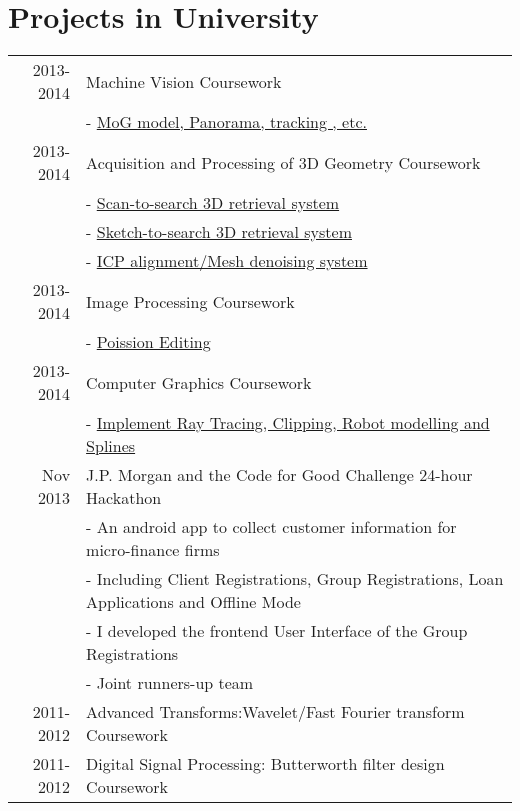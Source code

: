 \documentclass[a4paper,10pt]{article}
\begin{document}
\section{Projects in University}
\begin{tabular}{rp{12cm}}
2013-2014 &Machine Vision
\hfill{\textcolor[rgb]{0.7,0.7,0.7}{Coursework}}\\
         & - \href{https://github.com/mincongzhang/MachineVision}{MoG model, Panorama, tracking , etc.}\\
2013-2014 &Acquisition and Processing of 3D Geometry
\hfill{\textcolor[rgb]{0.7,0.7,0.7}{Coursework}}\\
         & - \href{https://github.com/mincongzhang/3D_Retrieval_scan2search}{Scan-to-search 3D retrieval system}\\
         & - \href{https://github.com/mincongzhang/3D_Retrieval_sketch2search}{Sketch-to-search 3D retrieval system}\\
         & - \href{https://github.com/mincongzhang/PlayWithOpenMesh}{ICP alignment/Mesh denoising system}\\
2013-2014 &Image Processing
\hfill{\textcolor[rgb]{0.7,0.7,0.7}{Coursework}}\\
         & - \href{https://github.com/mincongzhang/PoissionEditing}{Poission Editing}\\
2013-2014 &Computer Graphics
\hfill{\textcolor[rgb]{0.7,0.7,0.7}{Coursework}}\\
         & - \href{https://github.com/mincongzhang/PlayWithOpenGL}{Implement Ray Tracing, Clipping, Robot modelling and Splines}\\
Nov 2013 &J.P. Morgan and the Code for Good Challenge
\hfill{\textcolor[rgb]{0.7,0.7,0.7}{24-hour Hackathon}}\\
         & - An android app to collect customer information for micro-ﬁnance ﬁrms\\
         & - Including Client Registrations, Group Registrations, Loan Applications and Offline Mode\\
         & - I developed the frontend User Interface of the Group Registrations\\
         & - Joint runners-up team\\
2011-2012 &Advanced Transforms:Wavelet/Fast Fourier transform
\hfill{\textcolor[rgb]{0.7,0.7,0.7}{Coursework}}\\
2011-2012 &Digital Signal Processing: Butterworth filter design
\hfill{\textcolor[rgb]{0.7,0.7,0.7}{Coursework}}\\
\end{tabular}
\end{document}
